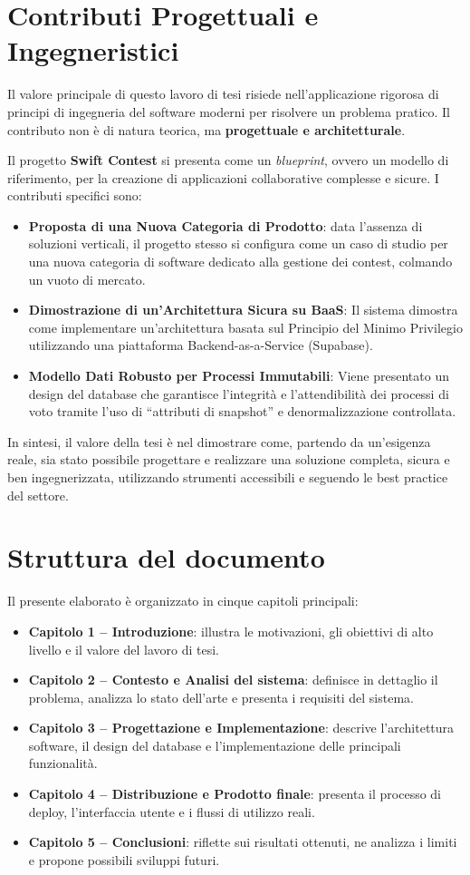 \section{Contributi Progettuali e Ingegneristici}\label{sec:contributi-progettuali-e-ingegneristici}
Il valore principale di questo lavoro di tesi risiede nell'applicazione rigorosa di principi di ingegneria del software moderni per risolvere un problema pratico.
Il contributo non è di natura teorica, ma \textbf{progettuale e architetturale}.

Il progetto \textbf{Swift Contest} si presenta come un \emph{blueprint}, ovvero un modello di riferimento, per la creazione di applicazioni collaborative complesse e sicure.
I contributi specifici sono:
\begin{itemize}
	\item \textbf{Proposta di una Nuova Categoria di Prodotto}: data l'assenza di soluzioni verticali, il progetto stesso si configura come un caso di studio per una nuova categoria di software dedicato alla gestione dei contest, colmando un vuoto di mercato.
	\item \textbf{Dimostrazione di un'Architettura Sicura su BaaS}: Il sistema dimostra come implementare un'architettura basata sul Principio del Minimo Privilegio utilizzando una piattaforma Backend-as-a-Service (Supabase).
	\item \textbf{Modello Dati Robusto per Processi Immutabili}: Viene presentato un design del database che garantisce l'integrità e l'attendibilità dei processi di voto tramite l'uso di ``attributi di snapshot'' e denormalizzazione controllata.
\end{itemize}
In sintesi, il valore della tesi è nel dimostrare come, partendo da un'esigenza reale, sia stato possibile progettare e realizzare una soluzione completa, sicura e ben ingegnerizzata, utilizzando strumenti accessibili e seguendo le best practice del settore.

\section{Struttura del documento}\label{sec:struttura-del-documento}
Il presente elaborato è organizzato in cinque capitoli principali:
\begin{itemize}
	\item \textbf{Capitolo 1 – Introduzione}: illustra le motivazioni, gli obiettivi di alto livello e il valore del lavoro di tesi.
	\item \textbf{Capitolo 2 – Contesto e Analisi del sistema}: definisce in dettaglio il problema, analizza lo stato dell’arte e presenta i requisiti del sistema.
	\item \textbf{Capitolo 3 – Progettazione e Implementazione}: descrive l’architettura software, il design del database e l’implementazione delle principali funzionalità.
	\item \textbf{Capitolo 4 – Distribuzione e Prodotto finale}: presenta il processo di deploy, l’interfaccia utente e i flussi di utilizzo reali.
	\item \textbf{Capitolo 5 – Conclusioni}: riflette sui risultati ottenuti, ne analizza i limiti e propone possibili sviluppi futuri.
\end{itemize}